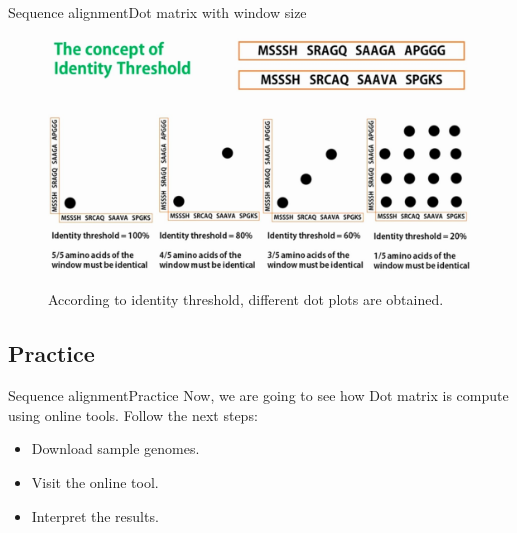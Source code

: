 \documentclass[10pt]{beamer}
\begin{document}
{%
\begin{frame}{Sequence alignment}{Dot matrix with window size}	
	\begin{figure}[]
		\centering
		\includegraphics[width=\textwidth,height=0.6\textheight,keepaspectratio]{img/alignment/dot_plot7.jpg}
		\label{img:uniprot}
		\caption{According to identity threshold, different dot plots are obtained.}
	\end{figure}
\end{frame}

\subsection{Practice}                                 %

\begin{frame}{Sequence alignment}{Practice}
Now, we are going to see how Dot matrix is compute using online tools. Follow the next steps:
\begin{itemize}
    \item Download sample genomes.
    \item Visit the online tool.
    \item Interpret the results.
\end{itemize}
\end{frame}

}
\end{document}
